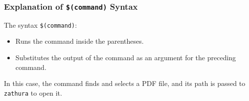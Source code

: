 \documentclass[12pt]{article}
\begin{document}
\subsubsection*{Explanation of \texttt{\$(command)} Syntax}
The syntax \texttt{\$(command)}:
\begin{itemize}
    \item Runs the command inside the parentheses.
    \item Substitutes the output of the command as an argument for the preceding command.
\end{itemize}
In this case, the command finds and selects a PDF file, and its path is passed to \texttt{zathura} to open it.
\end{document}
